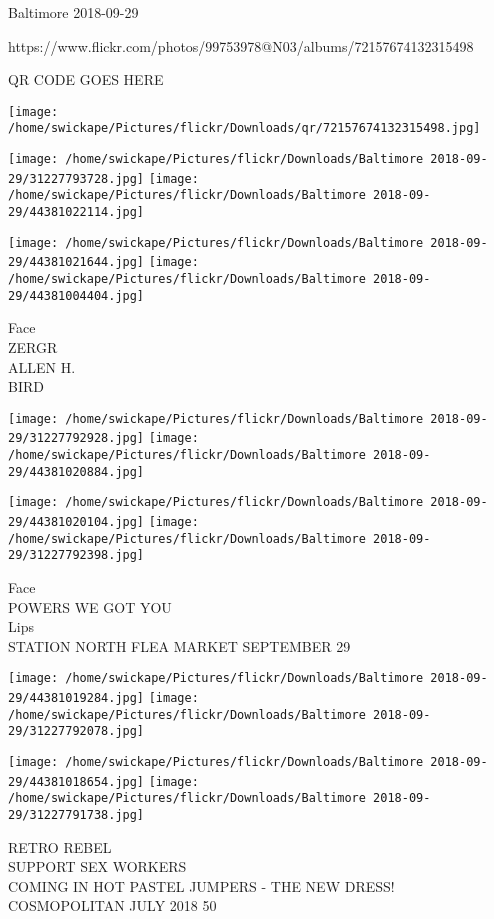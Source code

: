 \documentclass[10pt,letterpaper]{article}
\begin{document}
Baltimore 2018-09-29

https://www.flickr.com/photos/99753978@N03/albums/72157674132315498

QR CODE GOES HERE

\texttt{[image: /home/swickape/Pictures/flickr/Downloads/qr/72157674132315498.jpg]}
\pagebreak

\texttt{[image: /home/swickape/Pictures/flickr/Downloads/Baltimore 2018-09-29/31227793728.jpg]}
\texttt{[image: /home/swickape/Pictures/flickr/Downloads/Baltimore 2018-09-29/44381022114.jpg]}

\texttt{[image: /home/swickape/Pictures/flickr/Downloads/Baltimore 2018-09-29/44381021644.jpg]}
\texttt{[image: /home/swickape/Pictures/flickr/Downloads/Baltimore 2018-09-29/44381004404.jpg]}

Face\\
ZERGR\\
ALLEN H.\\
BIRD\\
\pagebreak

\texttt{[image: /home/swickape/Pictures/flickr/Downloads/Baltimore 2018-09-29/31227792928.jpg]}
\texttt{[image: /home/swickape/Pictures/flickr/Downloads/Baltimore 2018-09-29/44381020884.jpg]}

\texttt{[image: /home/swickape/Pictures/flickr/Downloads/Baltimore 2018-09-29/44381020104.jpg]}
\texttt{[image: /home/swickape/Pictures/flickr/Downloads/Baltimore 2018-09-29/31227792398.jpg]}

Face\\
POWERS WE GOT YOU\\
Lips\\
STATION NORTH FLEA MARKET SEPTEMBER 29\\
\pagebreak

\texttt{[image: /home/swickape/Pictures/flickr/Downloads/Baltimore 2018-09-29/44381019284.jpg]}
\texttt{[image: /home/swickape/Pictures/flickr/Downloads/Baltimore 2018-09-29/31227792078.jpg]}

\texttt{[image: /home/swickape/Pictures/flickr/Downloads/Baltimore 2018-09-29/44381018654.jpg]}
\texttt{[image: /home/swickape/Pictures/flickr/Downloads/Baltimore 2018-09-29/31227791738.jpg]}

RETRO REBEL\\
SUPPORT SEX WORKERS\\
COMING IN HOT PASTEL JUMPERS {-} THE NEW DRESS!\\
COSMOPOLITAN JULY 2018 50\\
\pagebreak
\end{document}
